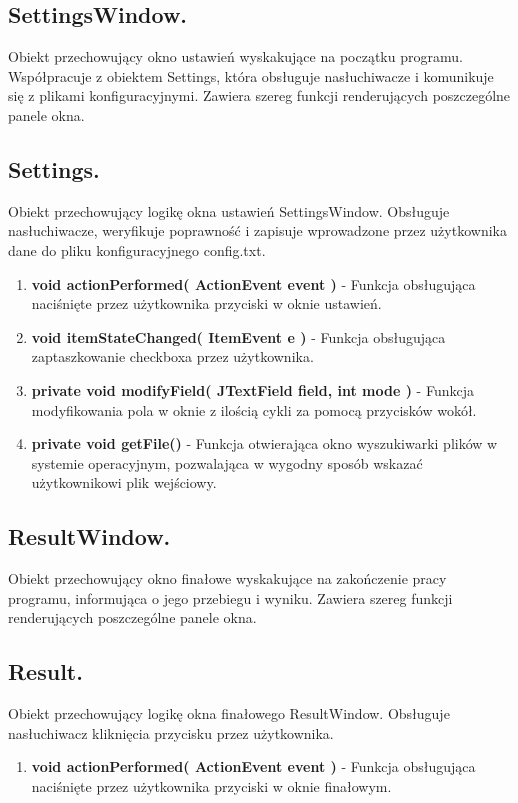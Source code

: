 \documentclass[a4paper]{article}
\begin{document}
\subsection{SettingsWindow.}
Obiekt przechowujący okno ustawień wyskakujące na początku programu. Współpracuje z obiektem Settings, która obsługuje nasłuchiwacze i komunikuje się z plikami konfiguracyjnymi. Zawiera szereg funkcji renderujących poszczególne panele okna.

\subsection{Settings.}
Obiekt przechowujący logikę okna ustawień SettingsWindow. Obsługuje nasłuchiwacze, weryfikuje poprawność i zapisuje wprowadzone przez użytkownika dane do pliku konfiguracyjnego config.txt.
\begin{enumerate}
    	\item \textbf{void actionPerformed( ActionEvent event )} - Funkcja obsługująca naciśnięte przez użytkownika przyciski w oknie ustawień.
    	\item \textbf{void itemStateChanged( ItemEvent e )} - Funkcja obsługująca zaptaszkowanie checkboxa przez użytkownika.
    	\item \textbf{private void modifyField( JTextField field, int mode )} - Funkcja modyfikowania pola w oknie z ilością cykli za pomocą przycisków wokół.
    	\item \textbf{private void getFile()} - Funkcja otwierająca okno wyszukiwarki plików w systemie operacyjnym, pozwalająca w wygodny sposób wskazać użytkownikowi plik wejściowy.
\end{enumerate}

\subsection{ResultWindow.}
Obiekt przechowujący okno finałowe wyskakujące na zakończenie pracy programu, informująca o jego przebiegu i wyniku. Zawiera szereg funkcji renderujących poszczególne panele okna.

\subsection{Result.}
Obiekt przechowujący logikę okna finałowego ResultWindow. Obsługuje nasłuchiwacz kliknięcia przycisku przez użytkownika.
\begin{enumerate}
    	\item \textbf{void actionPerformed( ActionEvent event )} - Funkcja obsługująca naciśnięte przez użytkownika przyciski w oknie finałowym.
\end{enumerate}
\end{document}
